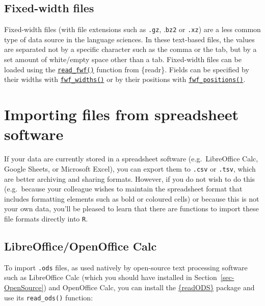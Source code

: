 \documentclass[
  letterpaper,
  DIV=11,
  numbers=noendperiod]{scrreprt}
\begin{document}
\subsection{Fixed-width files}\label{fixed-width-files}

Fixed-width files (with file extensions such as \texttt{.gz},
.\texttt{bz2} or \texttt{.xz}) are a less common type of data source in
the language sciences. In these text-based files, the values are
separated not by a specific character such as the comma or the tab, but
by a set amount of white/empty space other than a tab. Fixed-width files
can be loaded using the
\href{https://readr.tidyverse.org/reference/read_fwf.html}{\texttt{read\_fwf()}}
function from \{readr\}. Fields can be specified by their widths with
\href{https://readr.tidyverse.org/reference/read_fwf.html}{\texttt{fwf\_widths()}}
or by their positions with
\href{https://readr.tidyverse.org/reference/read_fwf.html}{\texttt{fwf\_positions()}}.

\section{Importing files from spreadsheet
software}\label{sec-SpreadsheetSoftware}

If your data are currently stored in a spreadsheet software
(e.g.~LibreOffice Calc, Google Sheets, or Microsoft Excel), you can
export them to \texttt{.csv} or \texttt{.tsv}, which are better
archiving and sharing formats. However, if you do not wish to do this
(e.g.~because your colleague wishes to maintain the spreadsheet format
that includes formatting elements such as bold or coloured cells) or
because this is not your own data, you'll be pleased to learn that there
are functions to import these file formats directly into \texttt{R}.

\subsection{LibreOffice/OpenOffice
Calc}\label{libreofficeopenoffice-calc}

To import \texttt{.ods} files, as used natively by open-source text
processing software such as LibreOffice Calc (which you should have
installed in Section~\ref{sec-OpenSource}) and OpenOffice Calc, you can
install the
\href{https://www.rdocumentation.org/packages/readODS/versions/2.3.0}{\{readODS\}}
package and use its \texttt{read\_ods()} function:
\end{document}
